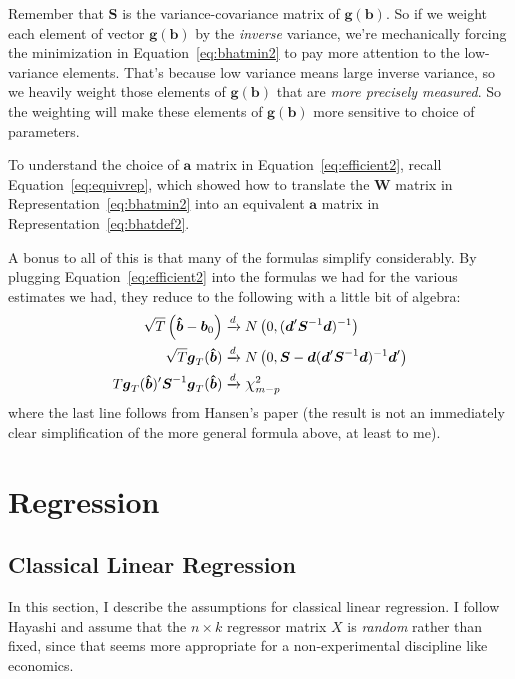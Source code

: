 \documentclass[12pt]{article}
\theoremstyle{plain}
\theoremstyle{definition}
\theoremstyle{remark}
\newcommand*{\Chi}{\mbox{\large$\chi$}} %
\newcommand{\bsb}{\boldsymbol{b}}
\newcommand{\bshatb}{\boldsymbol{\hat{b}}}
\newcommand{\bsd}{\boldsymbol{d}}
\newcommand{\bsg}{\boldsymbol{g}}
\newcommand{\bsS}{\boldsymbol{S}}
\begin{document}
Remember that $\bsS$ is the variance-covariance matrix of
$\bsg(\bsb)$. So if we weight each element of vector
$\bsg(\bsb)$ by the \emph{inverse} variance, we're
mechanically forcing the minimization in Equation~\ref{eq:bhatmin2} to
pay more attention to the low-variance elements. That's because low
variance means large inverse variance, so we heavily weight those
elements of $\bsg(\bsb)$ that are \emph{more
precisely measured}. So the weighting will make these elements of
$\bsg(\bsb)$ more sensitive to choice of parameters.

To understand the choice of $\boldsymbol{a}$ matrix in
Equation~\ref{eq:efficient2}, recall Equation~\ref{eq:equivrep}, which
showed how to translate the $\boldsymbol{W}$ matrix in
Representation~\ref{eq:bhatmin2} into an equivalent $\boldsymbol{a}$
matrix in Representation~\ref{eq:bhatdef2}.

A bonus to all of this is that many of the formulas simplify
considerably. By plugging Equation~\ref{eq:efficient2} into the formulas
we had for the various estimates we had, they reduce to the following
with a little bit of algebra:
\begin{align*}
  \sqrt{T}\left(\bshatb-\bsb_0\right)
  &\xrightarrow{d}
  N\left(0,
  (\bsd' \bsS^{-1} \bsd)^{-1}
  \right)\\
  \sqrt{T}\bsg_T(\bshatb)
  &\xrightarrow{d}
  N\left(
  0,
  \bsS
  -\bsd(\bsd' \bsS^{-1} \bsd)^{-1}
  \bsd'
  \right)\\
  T
  \bsg_T(\bshatb)'
  \bsS^{-1}
  \bsg_T(\bshatb)
  &\xrightarrow{d} \Chi^2_{m-p}
\end{align*}
where the last line follows from Hansen's paper (the result is not an
immediately clear simplification of the more general formula above, at
least to me).

\clearpage
\section{Regression}

\subsection{Classical Linear Regression}

In this section, I describe the assumptions for classical linear
regression. I follow Hayashi and assume that the $n\times k$ regressor
matrix $X$ is \emph{random} rather than fixed, since that seems more
appropriate for a non-experimental discipline like economics.
\end{document}
